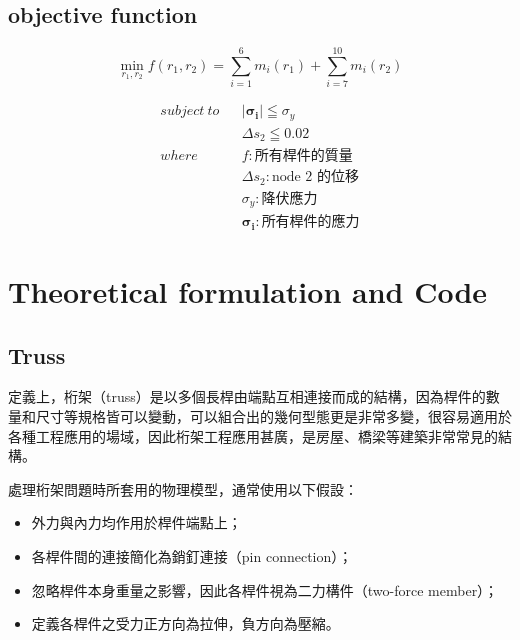 \documentclass[12pt]{article}
\numberwithin{figure}{section}
\numberwithin{table}{section}
\numberwithin{equation}{section}
\begin{document}
\begin{CJK}{UTF8}{bkai}
\subsection{objective function}

\begin{equation}
    \label{obj_fun}
    \min_{r_1,r_2}  f(r_1,r_2)  = \sum_{i=1}^{6} m_i(r_1)+\sum_{i=7}^{10} m_i(r_2) 
\end{equation}

\begin{eqnarray*}    \label{eq}
    subject\ to   & & \left\lvert \boldsymbol{\sigma_i}\right\rvert \leqq \sigma_y    \\
                  & &\Delta s_2\leqq 0.02    \\
    where         & &f : \text {所有桿件的質量}    \\
                  & &\Delta s_2: \text {node 2 的位移} \\
                  & &\sigma _y: \text{降伏應力} \\
                  & &\boldsymbol{\sigma_i}: \text{所有桿件的應力}
\end{eqnarray*}


\clearpage
\section{Theoretical formulation and Code}

\subsection{Truss}

定義上，桁架（truss）是以多個長桿由端點互相連接而成的結構，因為桿件的數量和尺寸等規格皆可以變動，可以組合出的幾何型態更是非常多變，很容易適用於各種工程應用的場域，因此桁架工程應用甚廣，是房屋、橋梁等建築非常常見的結構。

處理桁架問題時所套用的物理模型，通常使用以下假設：
\begin{itemize}
    \item 外力與內力均作用於桿件端點上；
    \item 各桿件間的連接簡化為銷釘連接（pin connection）；
    \item 忽略桿件本身重量之影響，因此各桿件視為二力構件（two-force member）；
    \item 定義各桿件之受力正方向為拉伸，負方向為壓縮。
\end{itemize}




\end{CJK}
\end{document}
